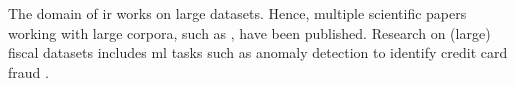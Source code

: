 The domain of \ac{ir} works on large datasets.
Hence, multiple scientific papers working with large corpora, such as \cite{WordRep2013}, have been published.
Research on (large) fiscal datasets includes \ac{ml} tasks such as anomaly detection to identify credit card fraud
\cite{credit_f_SOM2006, fd_ARIMA2021, cf_AE2020, AE_RF2021, dt_svm_2012, kaggle_ex2017}.
